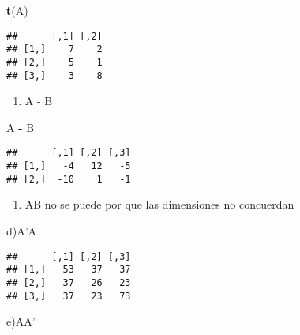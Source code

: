 \documentclass[
]{article}
\newenvironment{Shaded}{\begin{snugshade}}{\end{snugshade}}
\newcommand{\CommentTok}[1]{\textcolor[rgb]{0.56,0.35,0.01}{\textit{#1}}}
\newcommand{\KeywordTok}[1]{\textcolor[rgb]{0.13,0.29,0.53}{\textbf{#1}}}
\newcommand{\NormalTok}[1]{#1}
\newcommand{\OperatorTok}[1]{\textcolor[rgb]{0.81,0.36,0.00}{\textbf{#1}}}
\newcommand{\StringTok}[1]{\textcolor[rgb]{0.31,0.60,0.02}{#1}}
\providecommand{\tightlist}{%
  \setlength{\itemsep}{0pt}\setlength{\parskip}{0pt}}
\begin{document}
\begin{Shaded}
\begin{Highlighting}[]
\KeywordTok{t}\NormalTok{(A)}
\end{Highlighting}
\end{Shaded}

\begin{verbatim}
##      [,1] [,2]
## [1,]    7    2
## [2,]    5    1
## [3,]    3    8
\end{verbatim}

\begin{enumerate}
\def\labelenumi{\alph{enumi})}
\setcounter{enumi}{1}
\tightlist
\item
  A - B
\end{enumerate}

\begin{Shaded}
\begin{Highlighting}[]
\NormalTok{A }\OperatorTok{-}\StringTok{ }\NormalTok{B}
\end{Highlighting}
\end{Shaded}

\begin{verbatim}
##      [,1] [,2] [,3]
## [1,]   -4   12   -5
## [2,]  -10    1   -1
\end{verbatim}

\begin{enumerate}
\def\labelenumi{\alph{enumi})}
\setcounter{enumi}{2}
\tightlist
\item
  AB no se puede por que las dimensiones no concuerdan
\end{enumerate}

\begin{Shaded}
\end{Shaded}

d)A'A

\begin{Shaded}
\end{Shaded}

\begin{verbatim}
##      [,1] [,2] [,3]
## [1,]   53   37   37
## [2,]   37   26   23
## [3,]   37   23   73
\end{verbatim}

e)AA'
\end{document}
